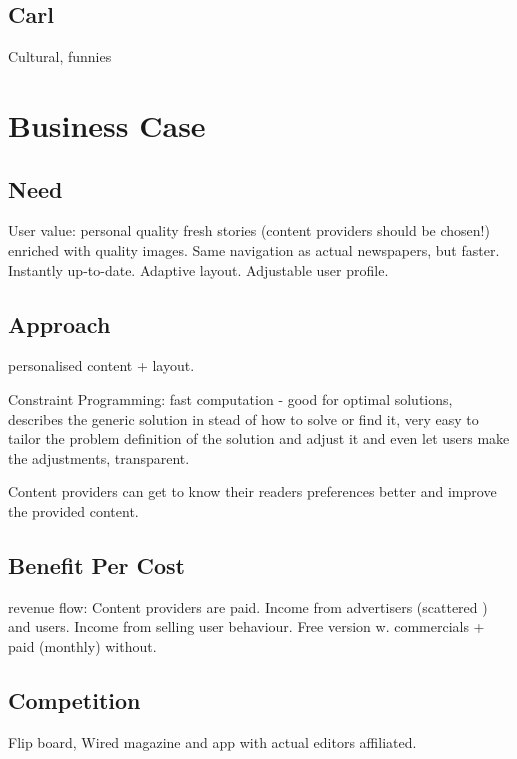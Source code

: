 \subsection{Carl}
Cultural, funnies

\section{Business Case}

\subsection{Need}
User value: personal quality fresh stories (content providers should be chosen!) enriched with quality images. Same navigation as actual newspapers, but faster. Instantly up-to-date. Adaptive layout. Adjustable user profile.

\subsection{Approach}
personalised content + layout.

Constraint Programming: fast computation - good for optimal solutions, describes the generic solution in stead of how to solve or find it, very easy to tailor the problem definition of the solution and adjust it and even let users make the adjustments, transparent.

Content providers can get to know their readers preferences better and improve the provided content.

\subsection{Benefit Per Cost}
revenue flow: Content providers are paid. Income from advertisers (scattered \cite[p. 6-7]{kristin_fredrik.pdf}) and users. Income from selling user behaviour. Free version w. commercials + paid (monthly) without.

\subsection{Competition}
Flip board, Wired magazine and app with actual editors affiliated.


